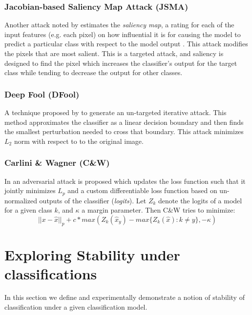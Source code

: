 \documentclass[10pt]{extarticle}
\begin{document}
\subsubsection{Jacobian-based Saliency Map Attack (JSMA)} Another attack noted by  \cite{papernot_limitations_2015}
  estimates the \emph{saliency map}, a rating for each of the input features (e.g. each pixel) on how influential it is for causing the model to predict a particular class with respect to the model output \cite{wiyatno2018saliency}. This attack modifies the pixels that are most salient. This is a targeted attack, and saliency is designed to find the pixel which increases the classifier's output for the target class while tending to decrease the output for other classes.

\subsubsection{Deep Fool (DFool)} A technique proposed by \cite{moosavi-dezfooli_deepfool:_2015}
  to generate an un-targeted iterative attack. 
This method approximates the classifier as a linear decision boundary and then finds the smallest perturbation needed to cross that boundary.
This attack minimizes $L_2$ norm with respect to  to the original image.

\subsubsection{Carlini \& Wagner (C\&W)} In \cite{carlini_towards_2016}
  an adversarial attack is proposed which updates the loss function such that it jointly minimizes $L_p$ and a custom differentiable loss function based on un-normalized outputs of the classifier (\textit{logits}). 
Let $Z_k$ denote the logits of a model for a given class $k$, and $\kappa$ a margin parameter. Then C\&W tries to minimize:
\begin{equation}
|| x - \hat{x} ||_p + c* max\left(Z_k(\hat{x}_y) - max\{Z_k(\hat{x}) : k \neq y\},-\kappa\right)
\end{equation}






\section{Exploring Stability under classifications}
In this section we define and experimentally demonstrate a notion of stability of classification under a given classification model. 
\end{document}

